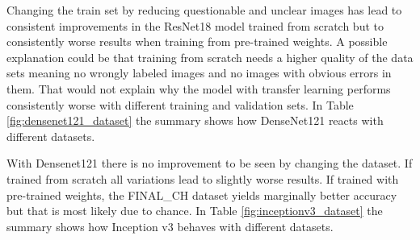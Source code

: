 Changing the train set by reducing questionable and unclear images has lead to consistent improvements in the ResNet18 model trained from scratch but to consistently worse results when training from pre-trained weights. A possible explanation could be that training from scratch needs a higher quality of the data sets meaning no wrongly labeled images and no images with obvious errors in them. That would not explain why the model with transfer learning performs consistently worse with different training and validation sets. In Table \ref{fig:densenet121_dataset} the summary shows how DenseNet121 reacts with different datasets.

\begin{table}[h] \centering
{}
\caption{Dataset variations with DenseNet121. The first column shows how the datasets performed when trained from scratch whereas the second column shows how the datasets performed with pre-training.}
\label{tbl:densenet121_dataset}
\end{table}

With Densenet121 there is no improvement to be seen by changing the dataset. If trained from scratch all variations lead to slightly worse results. If trained with pre-trained weights, the FINAL\_CH dataset yields marginally better accuracy but that is most likely due to chance. In Table \ref{fig:inceptionv3_dataset} the summary shows how Inception v3 behaves with different datasets.


